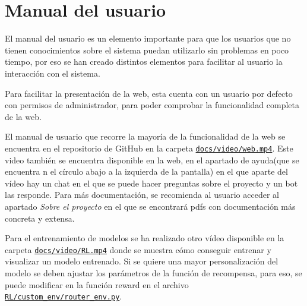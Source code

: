 \section{Manual del usuario}
El manual del usuario es un elemento importante para que los usuarios que no tienen conocimientos sobre el sistema puedan utilizarlo sin problemas en poco tiempo, por eso se han creado distintos elementos para facilitar al usuario la interacción con el sistema.

Para facilitar la presentación de la web, esta cuenta con un usuario por defecto con permisos de administrador, para poder comprobar la funcionalidad completa de la web.

El manual de usuario que recorre la mayoría de la funcionalidad de la web se encuentra en el repositorio de GitHub en la carpeta \href{https://github.com/CesarRodrigu/GII-24.19-contramedidas-IoT-mediante-reinforcement-learning/tree/main/docs/video/web.mp4}{\texttt{docs/video/web.mp4}}.
Este video también se encuentra disponible en la web, en el apartado de ayuda(que se encuentra n el círculo abajo a la izquierda de la pantalla) en el que aparte del vídeo hay un chat en el que se puede hacer preguntas sobre el proyecto y un bot las responde. 
Para más documentación, se recomienda al usuario acceder al apartado \textit{Sobre el proyecto} en el que se encontrará pdfs con documentación más concreta y extensa.

Para el entrenamiento de modelos se ha realizado otro vídeo disponible en la carpeta \href{https://github.com/CesarRodrigu/GII-24.19-contramedidas-IoT-mediante-reinforcement-learning/tree/main/docs/video/RL.mp4}{\texttt{docs/video/RL.mp4}} donde se muestra cómo conseguir entrenar y visualizar un modelo entrenado. Si se quiere una mayor personalización del modelo se deben ajustar los parámetros de la función de recompensa, para eso, se puede modificar en la función reward en el archivo \href{https://github.com/CesarRodrigu/GII-24.19-contramedidas-IoT-mediante-reinforcement-learning/blob/main/RL/custom_env/router_env.py}{\texttt{RL/custom\_env/router\_env.py}}.
